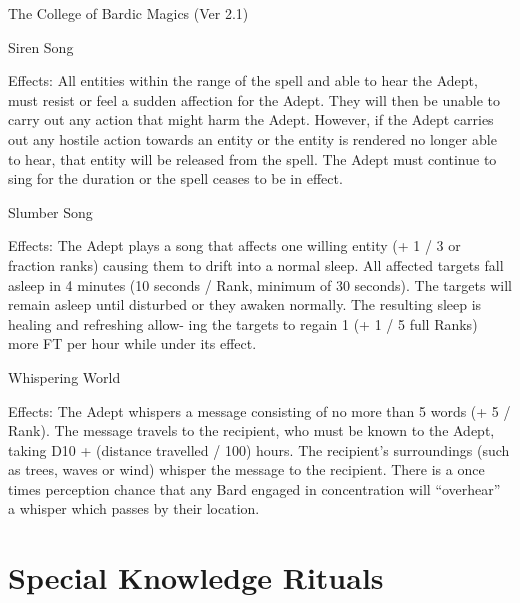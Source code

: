 \begin{Chapter}{The College of Bardic Magics (Ver 2.1)}
\begin{spell}[S-12]{Siren Song }

Effects:  All  entities  within  the  range  of  the  spell 
and  able  to  hear  the  Adept,  must  resist  or  feel  a 
sudden  affection  for  the  Adept.  They  will  then  be 
unable to carry out any action that might harm the 
Adept. However, if the  Adept carries out any hostile  action  towards  an  entity  or  the  entity  is  rendered  no  longer  able  to  hear,  that  entity  will  be 
released  from  the  spell.  The  Adept  must  continue 
to sing for the duration or the spell ceases to be in 
effect. 
\end{spell}

\begin{spell}[S-13]{Slumber Song }

Effects:  The  Adept  plays  a  song  that  affects  one 
willing  entity  (+  1  /  3  or  fraction  ranks)  causing 
them to  drift into  a  normal  sleep.  All  affected  targets  fall  asleep  in  4  minutes  (10  seconds  /  Rank, 
minimum  of  30  seconds).  The  targets  will  remain 
asleep  until  disturbed  or  they  awaken  normally. 
The resulting sleep is healing and refreshing allow-
ing the targets to regain 1 (+ 1 / 5 full Ranks) more 
FT per hour while under its effect. 
\end{spell}

\begin{spell}[S-14]{Whispering World }

Effects:  The  Adept  whispers  a  message  consisting 
of no more than 5 words (+ 5 / Rank). The message 
travels to the recipient, who must be known to the 
Adept,  taking  D10  +  (distance  travelled  /  100) 
hours.  The  recipient’s  surroundings  (such  as trees, 
waves or  wind) whisper the message to the recipient.  There  is  a  once  times  perception  chance  that 
any Bard engaged in concentration will “overhear” 
a whisper which passes by their location. 
\end{spell}

\section{Special Knowledge Rituals}


\end{Chapter}
